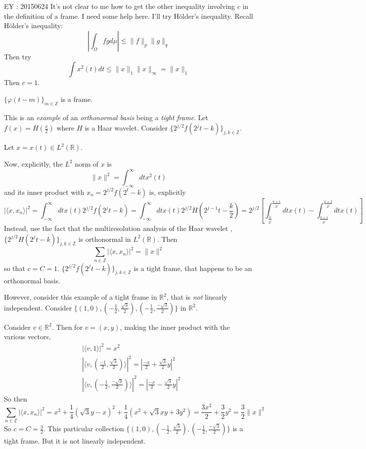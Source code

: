 \documentclass[twoside]{amsart}
\theoremstyle{plain}
\theoremstyle{definition}
\theoremstyle{remark}
\numberwithin{equation}{section}
\begin{document}
EY : 20150624 It's not clear to me how to get the other inequality involving $c$ in the definition of a frame.  I need some help here. I'll try H\"{o}lder's inequality.  Recall H\"{o}lder's inequality\cite{ELiebMLoss2001}:
\[
| \int_{\Omega} fg d\mu | \leq \| f \|_p \| g \|_q
\]
Then try
\[
\int x^2(t) dt \leq \| x \|_1 \| x \|_{\infty} = \| x \|_1
\]
Then $c=1$.  

$\lbrace \varphi(t-m) \rbrace_{m\in \mathbb{Z}}$ is a frame.

\hrulefill

This is an \emph{example} of an \emph{orthonormal basis} being a \emph{tight frame}.  Let $f(x) = H\left( \frac{x}{2} \right)$ where $H$ is a Haar wavelet.  Consider $\lbrace 2^{j/2} f(2^jt-k) \rbrace_{j,k \in \mathbb{Z}}$.  

Let $x = x(t) \in L^2(\mathbb{R})$.  

Now, explicitly, the $L^2$ norm of $x$ is 
\[
\| x\|^2 = \int_{-\infty}^{\infty} dt x^2(t)
\]
and its inner product with $x_n = 2^{j/2} f(2^t-k)$ is, explicitly
\[
| \langle x , x_n \rangle |^2 = \int_{-\infty}^{\infty} dt x(t) 2^{j/2} f(2^j t-k) = \int_{-\infty}^{\infty} dt x(t) 2^{j/2} H(2^{j-1} t - \frac{k}{2} ) = 2^{j/2} \left[ \int_{\frac{k}{2^j}}^{\frac{k+1}{2^j}} dt x(t) - \int_{\frac{k+1}{2^j} }^{\frac{k+2}{2^j} } dt x(t) \right] 
\]
Instead, use the fact that the multiresolution analysis of the Haar wavelet , $\lbrace 2^{j/2} H(2^jt -k)\rbrace_{j,k \in \mathbb{Z}}$ is orthonormal in $L^2(\mathbb{R})$.  Then
\[
\sum_{n\in \mathbb{Z}} |\langle x,x_n \rangle|^2 = \| x \|^2
\]
so that $c=C=1$.  $\lbrace 2^{j/2} f(2^jt-k) \rbrace_{j,k \in \mathbb{Z}}$ is a tight frame, that happens to be an orthonormal basis.  

However, consider this example of a tight frame in $\mathbb{R}^2$, that is \emph{not} linearly independent.  Consider $\lbrace (1,0), (-\frac{1}{2}, \frac{\sqrt{3}}{2} ), (-\frac{1}{2}, \frac{-\sqrt{3}}{2} )  \rbrace$ in $\mathbb{R}^2$.    

Consider $v\in \mathbb{R}^2$.  Then for $v = (x,y)$, making the inner product with the various vectors, 
\[
\begin{aligned}
  & | \langle v, 1 \rangle |^2 = x^2 \\ 
  & |\langle v, \left( \frac{-1}{2}, \frac{\sqrt{3}}{2} \right) \rangle|^2 = \left| \frac{-x}{2} + \frac{\sqrt{3}}{2} y \right|^2 \\ 
  & | \langle v, \left( - \frac{1}{2}, \frac{ -\sqrt{3}}{2} \right) \rangle |^2 = | \frac{-x}{2} -\frac{\sqrt{3}}{2} y |^2
\end{aligned}
\]
So then
\[
\sum_{n\in \mathbb{Z}} |\langle x , x_n \rangle |^2 = x^2 + \frac{1}{4} ( \sqrt{3}y-x)^2 + \frac{1}{4} (x^2 + \sqrt{3}xy + 3y^2) = \frac{3x^2}{2} + \frac{3}{2} y^2 = \frac{3}{2} \|x\|^2
\]
So $c=C=\frac{3}{2}$.  This particular collection $\lbrace (1,0), (-\frac{1}{2}, \frac{\sqrt{3}}{2} ), (-\frac{1}{2}, \frac{-\sqrt{3}}{2} )  \rbrace$ is a tight frame.  But it is not linearly independent. 
\end{document}
